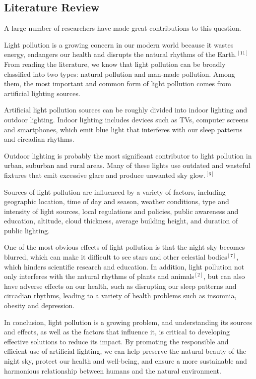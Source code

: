 \documentclass[12pt]{article}
\begin{document}
\subsection{Literature Review}
A large number of researchers have made great contributions to this question.

Light pollution is a growing concern in our modern world because it wastes energy, endangers our health and disrupts the natural rhythms of the Earth.$^{[11]}$ From reading the literature, we know that light pollution can be broadly classified into two types: natural pollution and man-made pollution. Among them, the most important and common form of light pollution comes from artificial lighting sources.

Artificial light pollution sources can be roughly divided into indoor lighting and outdoor lighting. Indoor lighting includes devices such as TVs, computer screens and smartphones, which emit blue light that interferes with our sleep patterns and circadian rhythms.

Outdoor lighting is probably the most significant contributor to light pollution in urban, suburban and rural areas. Many of these lights use outdated and wasteful fixtures that emit excessive glare and produce unwanted sky glow.$^{[6]}$

Sources of light pollution are influenced by a variety of factors, including geographic location, time of day and season, weather conditions, type and intensity of light sources, local regulations and policies, public awareness and education, altitude, cloud thickness, average building height, and duration of public lighting. 

One of the most obvious effects of light pollution is that the night sky becomes blurred, which can make it difficult to see stars and other celestial bodies$^{[7]}$, which hinders scientific research and education. In addition, light pollution not only interferes with the natural rhythms of plants and animals$^{[2]}$, but can also have adverse effects on our health, such as disrupting our sleep patterns and circadian rhythms, leading to a variety of health problems such as insomnia, obesity and depression. 

In conclusion, light pollution is a growing problem, and understanding its sources and effects, as well as the factors that influence it, is critical to developing effective solutions to reduce its impact. By promoting the responsible and efficient use of artificial lighting, we can help preserve the natural beauty of the night sky, protect our health and well-being, and ensure a more sustainable and harmonious relationship between humans and the natural environment.
\end{document}
